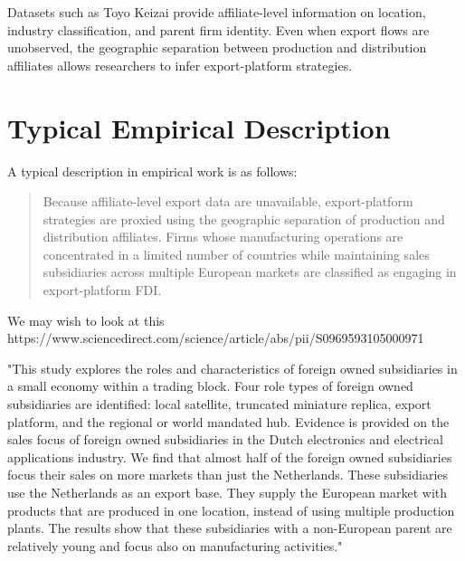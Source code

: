 \documentclass[11pt]{article}
\begin{document}
Datasets such as Toyo Keizai provide affiliate-level information on location, industry classification, and parent firm identity. Even when export flows are unobserved, the geographic separation between production and distribution affiliates allows researchers to infer export-platform strategies.

\section{Typical Empirical Description}

A typical description in empirical work is as follows:

\begin{quote}
Because affiliate-level export data are unavailable, export-platform strategies are proxied using the geographic separation of production and distribution affiliates. Firms whose manufacturing operations are concentrated in a limited number of countries while maintaining sales subsidiaries across multiple European markets are classified as engaging in export-platform FDI.
\end{quote}

We may wish to look at this\\

https://www.sciencedirect.com/science/article/abs/pii/S0969593105000971

"This study explores the roles and characteristics of foreign owned subsidiaries in a small economy within a trading block. Four role types of foreign owned subsidiaries are identified: local satellite, truncated miniature replica, export platform, and the regional or world mandated hub. Evidence is provided on the sales focus of foreign owned subsidiaries in the Dutch electronics and electrical applications industry. We find that almost half of the foreign owned subsidiaries focus their sales on more markets than just the Netherlands. These subsidiaries use the Netherlands as an export base. They supply the European market with products that are produced in one location, instead of using multiple production plants. The results show that these subsidiaries with a non-European parent are relatively young and focus also on manufacturing activities."
\end{document}
